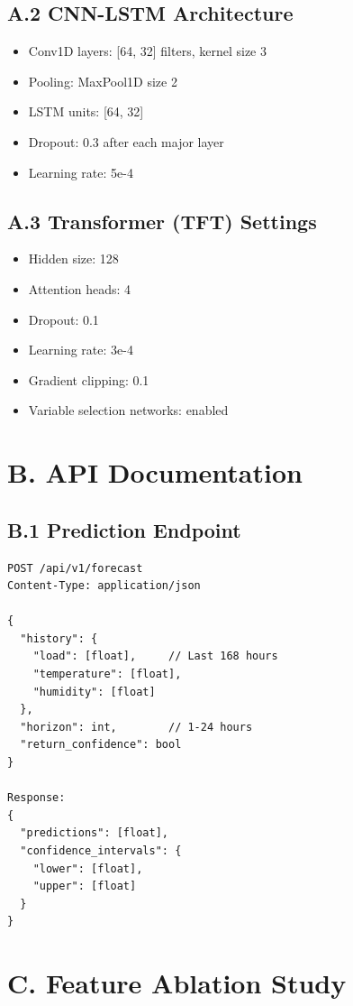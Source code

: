 \documentclass[12pt,a4paper]{report}
\begin{document}
\subsection*{A.2 CNN-LSTM Architecture}
\begin{itemize}
\item Conv1D layers: [64, 32] filters, kernel size 3
\item Pooling: MaxPool1D size 2
\item LSTM units: [64, 32]
\item Dropout: 0.3 after each major layer
\item Learning rate: 5e-4
\end{itemize}

\subsection*{A.3 Transformer (TFT) Settings}
\begin{itemize}
\item Hidden size: 128
\item Attention heads: 4
\item Dropout: 0.1
\item Learning rate: 3e-4
\item Gradient clipping: 0.1
\item Variable selection networks: enabled
\end{itemize}

\section*{B. API Documentation}

\subsection*{B.1 Prediction Endpoint}
\begin{verbatim}
POST /api/v1/forecast
Content-Type: application/json

{
  "history": {
    "load": [float],     // Last 168 hours
    "temperature": [float],
    "humidity": [float]
  },
  "horizon": int,        // 1-24 hours
  "return_confidence": bool
}

Response:
{
  "predictions": [float],
  "confidence_intervals": {
    "lower": [float],
    "upper": [float]
  }
}
\end{verbatim}

\section*{C. Feature Ablation Study}
\end{document}
